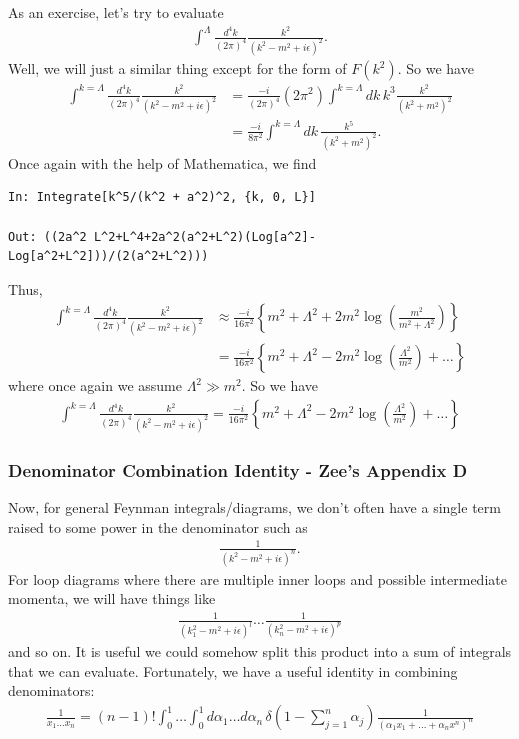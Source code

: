 \documentclass{book}
\theoremstyle{definition}
\newcommand{\f}[2]{\frac{#1}{#2}}
\newcommand{\lp}{\left(}
\newcommand{\rp}{\right)}
\newcommand{\lc}{\left\{}
\newcommand{\rc}{\right\}}
\begin{document}
As an exercise, let's try to evaluate
\begin{align}
\int^{\Lambda} \f{d^4k}{(2\pi)^4} \f{k^2}{(k^2 - m^2+ i\epsilon)^2}.
\end{align}
Well, we will just a similar thing except for the form of $F(k^2)$. So we have
\begin{align}
\int^{k=\Lambda} \f{d^4k}{(2\pi)^4} \f{k^2}{(k^2 - m^2+ i\epsilon)^2} &= \f{-i}{(2\pi)^4}(2\pi^2)\int^{k=\Lambda} dk\,k^3\f{k^2}{(k^2 + m^2)^2}\nonumber\\
&= \f{-i}{8\pi^2}\int^{k=\Lambda} dk\,\f{k^5}{(k^2 + m^2)^2}.
\end{align}
Once again with the help of Mathematica, we find 
\begin{lstlisting}
In: Integrate[k^5/(k^2 + a^2)^2, {k, 0, L}]

Out: ((2a^2 L^2+L^4+2a^2(a^2+L^2)(Log[a^2]-Log[a^2+L^2]))/(2(a^2+L^2)))
\end{lstlisting}
Thus,
\begin{align}
\int^{k=\Lambda} \f{d^4k}{(2\pi)^4} \f{k^2}{(k^2 - m^2+ i\epsilon)^2} &\approx \f{-i}{16\pi^2}\lc m^2 + \Lambda^2 + 2m^2\log\lp \f{m^2}{m^2 + \Lambda^2} \rp  \rc \nonumber\\
&= \f{-i}{16\pi^2}\lc m^2 + \Lambda^2 - 2m^2\log\lp \f{\Lambda^2}{m^2} \rp + \dots  \rc
\end{align}
where once again we assume $\Lambda^2 \gg m^2$. So we have
\begin{align}
\boxed{\int^{k=\Lambda} \f{d^4k}{(2\pi)^4} \f{k^2}{(k^2 - m^2+ i\epsilon)^2} = \f{-i}{16\pi^2}\lc m^2 + \Lambda^2 - 2m^2\log\lp \f{\Lambda^2}{m^2} \rp + \dots  \rc}
\end{align}




\subsubsection{Denominator Combination Identity - Zee's Appendix D}

Now, for general Feynman integrals/diagrams, we don't often have a single term raised to some power in the denominator such as
\begin{align}
\f{1}{(k^2 - m^2 + i\epsilon)^n}.
\end{align}
For loop diagrams where there are multiple inner loops and possible intermediate momenta, we will have things like
\begin{align}
\f{1}{(k_1^2 - m^2 + i\epsilon)^l} \dots \f{1}{(k_n^2 - m^2 + i\epsilon)^p}
\end{align}
and so on. It is useful we could somehow split this product into a sum of integrals that we can evaluate. Fortunately, we have a useful identity in combining denominators:
\begin{align}
\boxed{\f{1}{x_1\dots x_n} = (n-1)! \int^1_0\dots \int^1_0 d\alpha_1\dots d\alpha_n \, \delta\lp 1 - \sum^n_{j=1} \alpha_j \rp \f{1}{(\alpha_1 x_1 + \dots + \alpha_n x^n)^n}}
\end{align}
\end{document}
